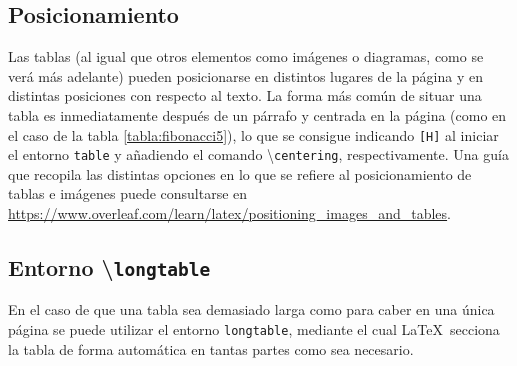 \subsection{Posicionamiento}

Las tablas (al igual que otros elementos como imágenes o diagramas, como se verá más adelante) pueden posicionarse en distintos lugares de la página y en distintas posiciones con respecto al texto. La forma más común de situar una tabla es inmediatamente después de un párrafo y centrada en la página (como en el caso de la tabla \ref{tabla:fibonacci5}), lo que se consigue indicando \texttt{[H]} al iniciar el entorno \texttt{table} y añadiendo el comando \textbackslash\texttt{centering}, respectivamente. Una guía que recopila las distintas opciones en lo que se refiere al posicionamiento de tablas e imágenes puede consultarse en \url{https://www.overleaf.com/learn/latex/positioning_images_and_tables}.


\newpage
\subsection{Entorno \textbackslash\texttt{longtable}}

En el caso de que una tabla sea demasiado larga como para caber en una única página se puede utilizar el entorno \texttt{longtable}, mediante el cual \LaTeX \ secciona la tabla de forma automática en tantas partes como sea necesario.

\vspace{10pt}

